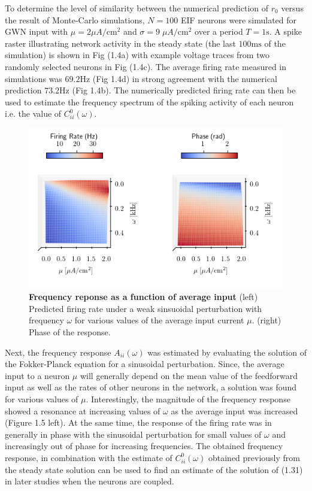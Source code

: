 \documentclass{ucetd}
\begin{document}
To determine the level of similarity between the numerical prediction of $r_{0}$ versus the result of Monte-Carlo simulations, $N=100$ EIF neurons were simulated for GWN input with $\mu = 2\mu A/\mathrm{cm}^{2}$ and $\sigma = 9 \;\mu A/\mathrm{cm}^{2}$ over a period $T = 1\mathrm{s}$. A spike raster illustrating network activity in the steady state (the last $100\mathrm{ms}$ of the simulation) is shown in Fig (1.4a) with example voltage traces from two randomly selected neurons in Fig (1.4c). The average firing rate measured in simulations was $69.2\mathrm{Hz}$ (Fig 1.4d) in strong agreement with the numerical prediction $73.2\mathrm{Hz}$ (Fig 1.4b). The numerically predicted firing rate can then be used to estimate the frequency spectrum of the spiking activity of each neuron i.e. the value of $C_{ii}^{0}(\omega)$. 

\begin{figure}[t!]
\centering
\includegraphics[width=150mm]{figure-4}
\caption{\textbf{Frequency reponse as a function of average input} (left) Predicted firing rate under a weak sinsuoidal perturbation with frequency $\omega$ for various values of the average input current $\mu$. (right) Phase of the response. }
\end{figure}


Next, the frequency response $A_{ii}(\omega)$ was estimated by evaluating the solution of the Fokker-Planck equation for a sinusoidal perturbation. Since, the average input to a neuron $\mu$ will generally depend on the mean value of the feedforward input as well as the rates of other neurons in the network, a solution was found for various values of $\mu$. Interestingly, the magnitude of the frequency response showed a resonance at increasing values of $\omega$ as the average input was increased (Figure 1.5 left). At the same time, the response of the firing rate was in generally in phase with the sinusoidal perturbation for small values of $\omega$ and increasingly out of phase for increasing frequencies. The obtained frequency response, in combination with the estimate of $C_{ii}^{0}(\omega)$ obtained previously from the steady state solution can be used to find an estimate of the solution of (1.31) in later studies when the neurons are coupled.
\end{document}

